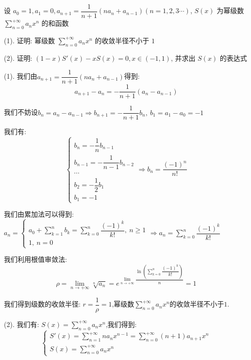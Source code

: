 \begin{example}[][Exam: 34.2.8]
	设 $a_{0}=1, a_{1}=0, a_{n+1}=\dfrac{1}{n+1}(na_{n}+a_{n-1})(n=1,2,3\cdots)$, 
	$S(x)$ 为幂级数 $\sum\limits_{n=0}^{+\infty}a_{n}x^{n}$ 的和函数

(1). 证明: 幂级数 $\sum\limits_{n=0}^{+\infty}a_{n}x^n$ 的收敛半径不小于 $1$

(2). 证明: $(1-x)S'(x)-xS(x)=0, x\in(-1,1)$, 并求出 $S(x)$ 的表达式
\end{example}

\begin{solution}

	(1). 我们由$a_{n+1}=\dfrac{1}{n+1}(na_{n}+a_{n-1})$得到:  
	$$a_{n+1}-a_{n}=-\dfrac{1}{n+1}(a_{n}-a_{n-1})$$
	
	我们不妨设$b_{n}=a_{n}-a_{n-1}\Rightarrow b_{n+1}=-\dfrac{1}{n+1}b_{n},\ b_{1}=a_{1}-a_{0}=-1$
	
	我们有:  $$\left\lbrace
	\begin{array}{l}
		b_{n}=-\dfrac{1}{n}b_{n-1}\\
		b_{n-1}=-\dfrac{1}{n-1}b_{n-2}\\
		\cdots\\
		b_{2}=-\dfrac{1}{2}b_{1}\\
		b_{1}=-1
	\end{array}
	\right. \Rightarrow b_{n}=\dfrac{(-1)^{n}}{n!}$$
	
	我们由累加法可以得到:  $a_{n}=\left\lbrace
	\begin{array}{l}
		a_{0}+\sum\limits_{k=1}^{n}b_{k}=\sum\limits_{k=0}^{n}\dfrac{(-1)^k}{k!},\ n\geq 1\\
		1,\ n=0
	\end{array}
	\right. \Rightarrow a_{n}=\sum\limits_{k=0}^{n}\dfrac{(-1)^k}{k!}$
	
	我们利用根值审敛法:  
	$$\rho=\lim\limits_{n\to+\infty}\sqrt[n]{a_{n}}=e^{\lim\limits_{n\to +\infty}\dfrac{\ln(\sum\limits_{k=0}^{n}\dfrac{(-1)^k}{k!})}{n}}=1$$
		
	我们得到级数的收敛半径:  $r=\dfrac{1}{\rho}=1$,幂级数$\sum\limits_{n=0}^{+\infty}a_{n}x^n$的收敛半径不小于$1$.

	(2). 我们有:  $S(x)=\sum\limits_{n=0}^{+\infty}a_{n}x^{n}$,我们得到:  
	$$\left\lbrace
	\begin{array}{l}
		S'(x)=\sum\limits_{n=1}^{+\infty}na_{n}x^{n-1}=\sum\limits_{n=0}^{+\infty}(n+1)a_{n+1}x^{n}\\
		S(x)=\sum\limits_{n=0}^{+\infty}a_{n}x^{n}
	\end{array}
	\right.$$
	

\end{solution}
